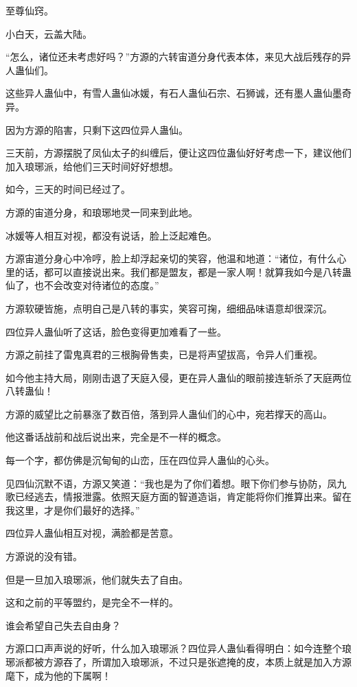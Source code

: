 
\begin{this_body}

至尊仙窍。

小白天，云盖大陆。

“怎么，诸位还未考虑好吗？”方源的六转宙道分身代表本体，来见大战后残存的异人蛊仙们。

这些异人蛊仙中，有雪人蛊仙冰媛，有石人蛊仙石宗、石狮诚，还有墨人蛊仙墨奇异。

因为方源的陷害，只剩下这四位异人蛊仙。

三天前，方源摆脱了凤仙太子的纠缠后，便让这四位蛊仙好好考虑一下，建议他们加入琅琊派，给他们三天时间好好想想。

如今，三天的时间已经过了。

方源的宙道分身，和琅琊地灵一同来到此地。

冰媛等人相互对视，都没有说话，脸上泛起难色。

方源宙道分身心中冷哼，脸上却浮起亲切的笑容，他温和地道：“诸位，有什么心里的话，都可以直接说出来。我们都是盟友，都是一家人啊！就算我如今是八转蛊仙了，也不会改变对待诸位的态度。”

方源软硬皆施，点明自己是八转的事实，笑容可掬，细细品味语意却很深沉。

四位异人蛊仙听了这话，脸色变得更加难看了一些。

方源之前挂了雷鬼真君的三根胸骨售卖，已是将声望拔高，令异人们重视。

如今他主持大局，刚刚击退了天庭入侵，更在异人蛊仙的眼前接连斩杀了天庭两位八转蛊仙！

方源的威望比之前暴涨了数百倍，落到异人蛊仙们的心中，宛若撑天的高山。

他这番话战前和战后说出来，完全是不一样的概念。

每一个字，都仿佛是沉甸甸的山峦，压在四位异人蛊仙的心头。

见四仙沉默不语，方源又笑道：“我也是为了你们着想。眼下你们参与协防，凤九歌已经逃去，情报泄露。依照天庭方面的智道造诣，肯定能将你们推算出来。留在我这里，才是你们最好的选择。”

四位异人蛊仙相互对视，满脸都是苦意。

方源说的没有错。

但是一旦加入琅琊派，他们就失去了自由。

这和之前的平等盟约，是完全不一样的。

谁会希望自己失去自由身？

方源口口声声说的好听，什么加入琅琊派？四位异人蛊仙看得明白：如今连整个琅琊派都被方源吞了，所谓加入琅琊派，不过只是张遮掩的皮，本质上就是加入方源麾下，成为他的下属啊！


\end{this_body}
